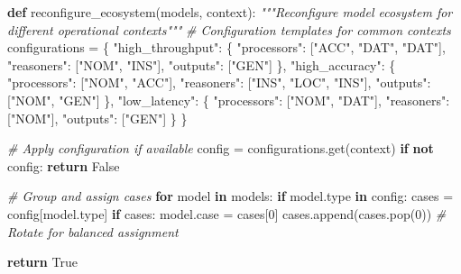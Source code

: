 \documentclass[
  11pt,
  letterpaper,
]{article}
\newenvironment{Shaded}{}{}
\newcommand{\BuiltInTok}[1]{#1}
\newcommand{\CommentTok}[1]{\textcolor[rgb]{0.38,0.63,0.69}{\textit{#1}}}
\newcommand{\ControlFlowTok}[1]{\textcolor[rgb]{0.00,0.44,0.13}{\textbf{#1}}}
\newcommand{\DecValTok}[1]{\textcolor[rgb]{0.25,0.63,0.44}{#1}}
\newcommand{\KeywordTok}[1]{\textcolor[rgb]{0.00,0.44,0.13}{\textbf{#1}}}
\newcommand{\NormalTok}[1]{#1}
\newcommand{\OperatorTok}[1]{\textcolor[rgb]{0.40,0.40,0.40}{#1}}
\newcommand{\StringTok}[1]{\textcolor[rgb]{0.25,0.44,0.63}{#1}}
\newcommand{\VariableTok}[1]{\textcolor[rgb]{0.10,0.09,0.49}{#1}}
\begin{document}
\begin{Shaded}
\begin{Highlighting}[]
\KeywordTok{def}\NormalTok{ reconfigure\_ecosystem(models, context):}
    \CommentTok{"""Reconfigure model ecosystem for different operational contexts"""}
    \CommentTok{\# Configuration templates for common contexts}
\NormalTok{    configurations }\OperatorTok{=}\NormalTok{ \{}
        \StringTok{"high\_throughput"}\NormalTok{: \{}
            \StringTok{"processors"}\NormalTok{: [}\StringTok{"ACC"}\NormalTok{, }\StringTok{"DAT"}\NormalTok{, }\StringTok{"DAT"}\NormalTok{],}
            \StringTok{"reasoners"}\NormalTok{: [}\StringTok{"NOM"}\NormalTok{, }\StringTok{"INS"}\NormalTok{], }
            \StringTok{"outputs"}\NormalTok{: [}\StringTok{"GEN"}\NormalTok{]}
\NormalTok{        \},}
        \StringTok{"high\_accuracy"}\NormalTok{: \{}
            \StringTok{"processors"}\NormalTok{: [}\StringTok{"NOM"}\NormalTok{, }\StringTok{"ACC"}\NormalTok{],}
            \StringTok{"reasoners"}\NormalTok{: [}\StringTok{"INS"}\NormalTok{, }\StringTok{"LOC"}\NormalTok{, }\StringTok{"INS"}\NormalTok{],}
            \StringTok{"outputs"}\NormalTok{: [}\StringTok{"NOM"}\NormalTok{, }\StringTok{"GEN"}\NormalTok{]}
\NormalTok{        \},}
        \StringTok{"low\_latency"}\NormalTok{: \{}
            \StringTok{"processors"}\NormalTok{: [}\StringTok{"NOM"}\NormalTok{, }\StringTok{"DAT"}\NormalTok{],}
            \StringTok{"reasoners"}\NormalTok{: [}\StringTok{"NOM"}\NormalTok{],}
            \StringTok{"outputs"}\NormalTok{: [}\StringTok{"GEN"}\NormalTok{]}
\NormalTok{        \}}
\NormalTok{    \}}
    
    \CommentTok{\# Apply configuration if available}
\NormalTok{    config }\OperatorTok{=}\NormalTok{ configurations.get(context)}
    \ControlFlowTok{if} \KeywordTok{not}\NormalTok{ config:}
        \ControlFlowTok{return} \VariableTok{False}
        
    \CommentTok{\# Group and assign cases}
    \ControlFlowTok{for}\NormalTok{ model }\KeywordTok{in}\NormalTok{ models:}
        \ControlFlowTok{if}\NormalTok{ model.}\BuiltInTok{type} \KeywordTok{in}\NormalTok{ config:}
\NormalTok{            cases }\OperatorTok{=}\NormalTok{ config[model.}\BuiltInTok{type}\NormalTok{]}
            \ControlFlowTok{if}\NormalTok{ cases:}
\NormalTok{                model.case }\OperatorTok{=}\NormalTok{ cases[}\DecValTok{0}\NormalTok{]}
\NormalTok{                cases.append(cases.pop(}\DecValTok{0}\NormalTok{))  }\CommentTok{\# Rotate for balanced assignment}
    
    \ControlFlowTok{return} \VariableTok{True}
\end{Highlighting}
\end{Shaded}
\end{document}
